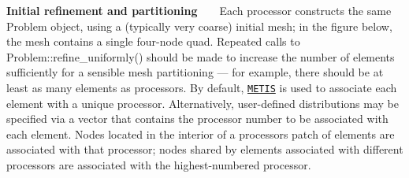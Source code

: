 \begin{DoxyItemize}
\item {\bfseries Initial refinement and partitioning} ~\newline
~\newline
 Each processor constructs the same {\ttfamily Problem} object, using a (typically very coarse) initial mesh; in the figure below, the mesh contains a single four-\/node quad. Repeated calls to {\ttfamily Problem\+::refine\+\_\+uniformly()} should be made to increase the number of elements sufficiently for a sensible mesh partitioning --- for example, there should be at least as many elements as processors. By default, \href{http://www-users.cs.umn.edu/~karypis/metis/}{\tt M\+E\+T\+IS} is used to associate each element with a unique processor. Alternatively, user-\/defined distributions may be specified via a vector that contains the processor number to be associated with each element. Nodes located in the interior of a processor\textquotesingle{}s patch of elements are associated with that processor; nodes shared by elements associated with different processors are associated with the highest-\/numbered processor. ~\newline
~\newline


\end{DoxyItemize}
